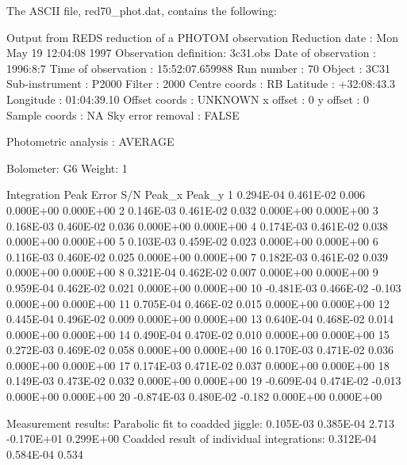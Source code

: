 \documentclass[twoside,11pt,fleqn,noabs]{starlink}
\begin{document}
The ASCII file, red70\_phot.dat, contains the following:

\begin{small}
\begin{terminalv}
Output from REDS reduction of a PHOTOM observation
Reduction date        : Mon May 19 12:04:08 1997
Observation definition: 3c31.obs
Date of observation   : 1996:8:7
Time of observation   : 15:52:07.659988
Run number            : 70
Object                : 3C31
Sub-instrument        : P2000
Filter                : 2000
Centre coords         : RB
Latitude              : +32:08:43.3
Longitude             : 01:04:39.10
Offset coords         : UNKNOWN
x offset              : 0
y offset              : 0
Sample coords         : NA
Sky error removal     : FALSE

Photometric analysis  : AVERAGE

Bolometer: G6
Weight:    1

Integration  Peak    Error       S/N      Peak_x     Peak_y
   1    0.294E-04  0.461E-02    0.006  0.000E+00  0.000E+00
   2    0.146E-03  0.461E-02    0.032  0.000E+00  0.000E+00
   3    0.168E-03  0.460E-02    0.036  0.000E+00  0.000E+00
   4    0.174E-03  0.461E-02    0.038  0.000E+00  0.000E+00
   5    0.103E-03  0.459E-02    0.023  0.000E+00  0.000E+00
   6    0.116E-03  0.460E-02    0.025  0.000E+00  0.000E+00
   7    0.182E-03  0.461E-02    0.039  0.000E+00  0.000E+00
   8    0.321E-04  0.462E-02    0.007  0.000E+00  0.000E+00
   9    0.959E-04  0.462E-02    0.021  0.000E+00  0.000E+00
  10   -0.481E-03  0.466E-02   -0.103  0.000E+00  0.000E+00
  11    0.705E-04  0.466E-02    0.015  0.000E+00  0.000E+00
  12    0.445E-04  0.496E-02    0.009  0.000E+00  0.000E+00
  13    0.640E-04  0.468E-02    0.014  0.000E+00  0.000E+00
  14    0.490E-04  0.470E-02    0.010  0.000E+00  0.000E+00
  15    0.272E-03  0.469E-02    0.058  0.000E+00  0.000E+00
  16    0.170E-03  0.471E-02    0.036  0.000E+00  0.000E+00
  17    0.174E-03  0.471E-02    0.037  0.000E+00  0.000E+00
  18    0.149E-03  0.473E-02    0.032  0.000E+00  0.000E+00
  19   -0.609E-04  0.474E-02   -0.013  0.000E+00  0.000E+00
  20   -0.874E-03  0.480E-02   -0.182  0.000E+00  0.000E+00

Measurement results:
 Parabolic fit to coadded jiggle:
        0.105E-03  0.385E-04    2.713 -0.170E+01  0.299E+00
  Coadded result of individual integrations:
        0.312E-04  0.584E-04    0.534
\end{terminalv}
\end{small}
\end{document}
